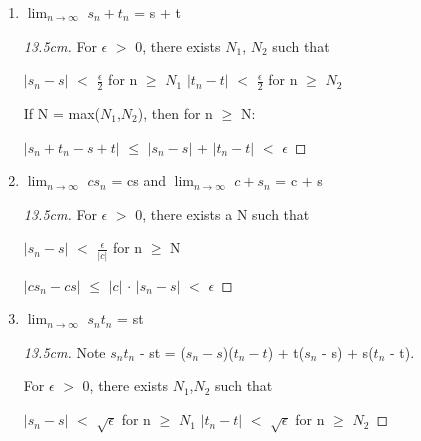 	\begin{enumerate}[label=(\alph*), leftmargin=2cm, itemsep=0.1cm]
        \item $\lim_{n \rightarrow \infty}$ $s_n + t_n$ = s + t
        
            \begin{proof}[13.5cm]
                For $\epsilon$ $>$ 0, there exists $N_1$, $N_2$ such that

                \hspace{0.5cm}
                $|s_n - s|$ $<$ $\frac{\epsilon}{2}$ for n $\geq$ $N_1$
                \hspace{1cm}
                $|t_n - t|$ $<$ $\frac{\epsilon}{2}$ for n $\geq$ $N_2$

                If N = max($N_1$,$N_2$), then for n $\geq$ N:

                \hspace{0.5cm}
                $|s_n+t_n - s+t|$ $\leq$ $|s_n - s|$ + $|t_n - t|$ $<$ $\epsilon$
            \end{proof}
        
        \item $\lim_{n \rightarrow \infty}$ $cs_n$ = cs and 
            $\lim_{n \rightarrow \infty}$ $c + s_n$ = c + s

            \begin{proof}[13.5cm]
                For $\epsilon$ $>$ 0, there exists a N such that

                \hspace{0.5cm}
                $|s_n - s|$ $<$ $\frac{\epsilon}{|c|}$
                \hspace{1cm}
                for n $\geq$ N

                \hspace{0.5cm}
                $|cs_n - cs|$ $\leq$ $|c|$ $\cdot$ $|s_n - s|$ $<$ $\epsilon$                
            \end{proof}
        
        \item $\lim_{n \rightarrow \infty}$ $s_n t_n$ = st
        
            \begin{proof}[13.5cm]
                Note $s_n t_n$ - st
                = ($s_n - s$)($t_n - t$) + t($s_n$ - s) + s($t_n$ - t).

                For $\epsilon$ $>$ 0, there exists $N_1$,$N_2$ such that

                \hspace{1cm}
                $|s_n - s|$ $<$ $\sqrt{\epsilon}$ for n $\geq$ $N_1$
                \hspace{1cm}
                $|t_n - t|$ $<$ $\sqrt{\epsilon}$ for n $\geq$ $N_2$


\end{proof}
\end{enumerate}
